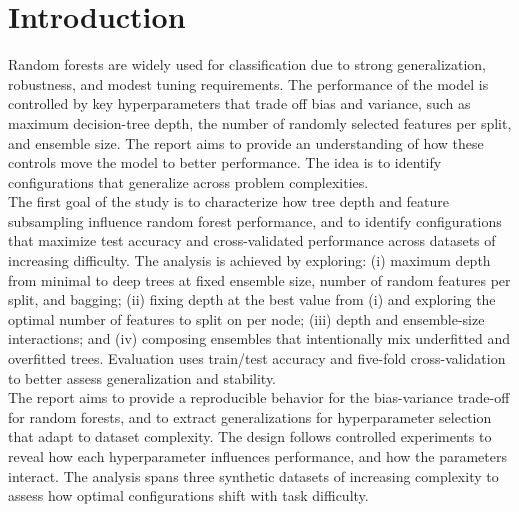 \documentclass[conference]{IEEEtran}
\begin{document}
\section{Introduction}

Random forests are widely used for classification due to strong generalization, robustness, and modest tuning requirements. The performance of the model is controlled by key hyperparameters that trade off bias and variance, such as maximum decision-tree depth, the number of randomly selected features per split, and ensemble size. The report aims to provide an understanding of how these controls move the model to better performance. The idea is to identify configurations that generalize across problem complexities.\\

The first goal of the study is to characterize how tree depth and feature subsampling influence random forest performance, and to identify configurations that maximize test accuracy and cross-validated performance across datasets of increasing difficulty. The analysis is achieved by exploring: (i) maximum depth from minimal to deep trees at fixed ensemble size, number of random features per split, and bagging; (ii) fixing depth at the best value from (i) and exploring the optimal number of features to split on per node; (iii) depth and ensemble-size interactions; and (iv) composing ensembles that intentionally mix underfitted and overfitted trees. Evaluation uses train/test accuracy and five-fold cross-validation to better assess generalization and stability.\\

The report aims to provide a reproducible behavior for the bias-variance trade-off for random forests, and to extract generalizations for hyperparameter selection that adapt to dataset complexity. The design follows controlled experiments to reveal how each hyperparameter influences performance, and how the parameters interact. The analysis spans three synthetic datasets of increasing complexity to assess how optimal configurations shift with task difficulty.\\
\end{document}
